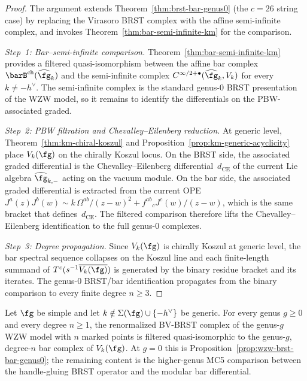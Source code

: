 \begin{proof}
The argument extends
Theorem~\ref{thm:brst-bar-genus0} \textup{(}the $c = 26$ string
case\textup{)} by replacing the Virasoro BRST complex with the
affine semi-infinite complex, and invokes
Theorem~\ref{thm:bar-semi-infinite-km} for the comparison.

\emph{Step~1: Bar--semi-infinite comparison.}
Theorem~\ref{thm:bar-semi-infinite-km} provides a filtered
quasi-isomorphism between the affine bar complex
$\barB^{\mathrm{ch}}(\widehat{\fg}_k)$ and the semi-infinite complex
$C^{\infty/2+\bullet}(\widehat{\fg}_k, V_k)$ for every
$k \neq -h^\vee$. The semi-infinite complex is the standard
genus-$0$ BRST presentation of the WZW model, so it remains to
identify the differentials on the PBW-associated graded.

\emph{Step~2: PBW filtration and Chevalley--Eilenberg reduction.}
At generic level, Theorem~\ref{thm:km-chiral-koszul} and
Proposition~\ref{prop:km-generic-acyclicity} place $V_k(\fg)$ on the
chirally Koszul locus. On the BRST side, the associated graded
differential is the Chevalley--Eilenberg differential~$d_{\mathrm{CE}}$
of the current Lie algebra $\widehat{\fg}_{k,-}$ acting on the
vacuum module. On the bar side, the associated graded differential
is extracted from the current OPE
$J^a(z) J^b(w) \sim k\,\Omega^{ab}/(z-w)^2 + f^{ab}{}_c J^c(w)/(z-w)$,
which is the same bracket that defines~$d_{\mathrm{CE}}$.
The filtered comparison therefore lifts the Chevalley--Eilenberg
identification to the full genus-$0$ complexes.

\emph{Step~3: Degree propagation.}
Since $V_k(\fg)$ is chirally Koszul at generic level, the bar spectral
sequence collapses on the Koszul line and each finite-length summand of
$T^c(s^{-1}\overline{V_k(\fg)})$ is generated by the binary residue
bracket and its iterates. The genus-$0$ BRST/bar identification
propagates from the binary comparison to every finite degree $n \geq 3$.
\end{proof}

\begin{conjecture}
\label{conj:wzw-brst-bar-all-genera}
Let $\fg$ be simple and let
$k \notin \Sigma(\fg) \cup \{-h^\vee\}$ be generic. For every
genus $g \geq 0$ and every degree $n \geq 1$, the renormalized
BV-BRST complex of the genus-$g$ WZW model with $n$ marked points is
filtered quasi-isomorphic to the genus-$g$, degree-$n$ bar complex of
$V_k(\fg)$. At $g=0$ this is
Proposition~\ref{prop:wzw-brst-bar-genus0}; the remaining content is
the higher-genus MC5 comparison between the handle-gluing BRST
operator and the modular bar differential.
\end{conjecture}

